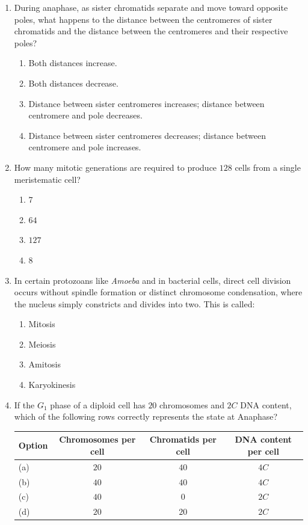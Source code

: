 \documentclass[11pt,a4paper]{article}
\begin{document}
\begin{enumerate}[label=\textbf{\arabic*.}, leftmargin=*]
\item During anaphase, as sister chromatids separate and move toward opposite poles, what happens to the distance between the centromeres of sister chromatids and the distance between the centromeres and their respective poles?
\begin{enumerate}[label=(\alph*)]
    \item Both distances increase.
    \item Both distances decrease.
    \item Distance between sister centromeres increases; distance between centromere and pole decreases.
    \item Distance between sister centromeres decreases; distance between centromere and pole increases.
\end{enumerate}

\item How many mitotic generations are required to produce $128$ cells from a single meristematic cell?
\begin{enumerate}[label=(\alph*)]
    \item $7$
    \item $64$
    \item $127$
    \item $8$
\end{enumerate}

\item In certain protozoans like \textit{Amoeba} and in bacterial cells, direct cell division occurs without spindle formation or distinct chromosome condensation, where the nucleus simply constricts and divides into two. This is called:
\begin{enumerate}[label=(\alph*)]
    \item Mitosis
    \item Meiosis
    \item Amitosis
    \item Karyokinesis
\end{enumerate}

\item If the $G_1$ phase of a diploid cell has $20$ chromosomes and $2C$ DNA content, which of the following rows correctly represents the state at Anaphase?
\begin{center}
\begin{tabular}{|l|c|c|c|}
\hline
\textbf{Option} & \textbf{Chromosomes per cell} & \textbf{Chromatids per cell} & \textbf{DNA content per cell} \\
\hline
(a) & $20$ & $40$ & $4C$ \\
(b) & $40$ & $40$ & $4C$ \\
(c) & $40$ & $0$ & $2C$ \\
(d) & $20$ & $20$ & $2C$ \\
\hline
\end{tabular}
\end{center}


\end{enumerate}
\end{document}
